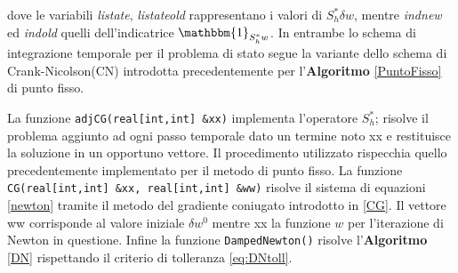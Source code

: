 dove le variabili \textit{listate}, \textit{listateold} rappresentano i valori di $ S^*_h\delta w $, mentre \textit{indnew} ed \textit{indold} quelli dell'indicatrice $\mathbbm{1}_{S^*_hw}$.
In entrambe lo schema di integrazione temporale per il problema di stato segue la variante dello schema di Crank-Nicolson(CN) introdotta precedentemente per l'\textbf{Algoritmo} \ref{PuntoFisso} di punto fisso.
\par
La funzione \texttt{adjCG(real[int,int] \&xx)} implementa l'operatore $S^*_h$; risolve il problema aggiunto ad ogni passo temporale dato un termine noto xx e restituisce la soluzione in un opportuno vettore. Il procedimento utilizzato rispecchia quello precedentemente implementato per il metodo di punto fisso.
La funzione \texttt{CG(real[int,int] \&xx, real[int,int] \&ww)} risolve il sistema di equazioni \eqref{newton} tramite il metodo del gradiente coniugato introdotto in \ref{CG}. Il vettore ww corrisponde al valore iniziale ${\delta}w^0$  mentre xx la funzione $ w $ per l'iterazione di Newton in questione.
Infine la funzione \texttt{DampedNewton()} risolve l'\textbf{Algoritmo} \ref{DN} rispettando il criterio di tolleranza \eqref{eq:DNtoll}.